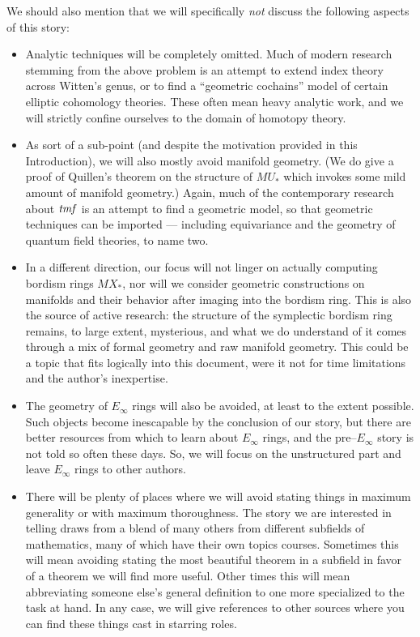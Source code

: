 We should also mention that we will specifically \emph{not} discuss the following aspects of this story:
\begin{itemize}
\item Analytic techniques will be completely omitted.  Much of modern research stemming from the above problem is an attempt to extend index theory across Witten's genus, or to find a ``geometric cochains'' model of certain elliptic cohomology theories.  These often mean heavy analytic work, and we will strictly confine ourselves to the domain of homotopy theory.
\item As sort of a sub-point (and despite the motivation provided in this Introduction), we will also mostly avoid manifold geometry.  (We do give a proof of Quillen's theorem on the structure of $MU_*$ which invokes some mild amount of manifold geometry.)  Again, much of the contemporary research about $\mathit{tmf}$ is an attempt to find a geometric model, so that geometric techniques can be imported --- including equivariance and the geometry of quantum field theories, to name two.
\item In a different direction, our focus will not linger on actually computing bordism rings $MX_*$, nor will we consider geometric constructions on manifolds and their behavior after imaging into the bordism ring.  This is also the source of active research: the structure of the symplectic bordism ring remains, to large extent, mysterious, and what we do understand of it comes through a mix of formal geometry and raw manifold geometry.  This could be a topic that fits logically into this document, were it not for time limitations and the author's inexpertise.
\item The geometry of $E_\infty$ rings will also be avoided, at least to the extent possible.  Such objects become inescapable by the conclusion of our story, but there are better resources from which to learn about $E_\infty$ rings, and the pre--$E_\infty$ story is not told so often these days.  So, we will focus on the unstructured part and leave $E_\infty$ rings to other authors.
\item There will be plenty of places where we will avoid stating things in maximum generality or with maximum thoroughness.  The story we are interested in telling draws from a blend of many others from different subfields of mathematics, many of which have their own topics courses.  Sometimes this will mean avoiding stating the most beautiful theorem in a subfield in favor of a theorem we will find more useful.  Other times this will mean abbreviating someone else's general definition to one more specialized to the task at hand.  In any case, we will give references to other sources where you can find these things cast in starring roles.
\end{itemize}

